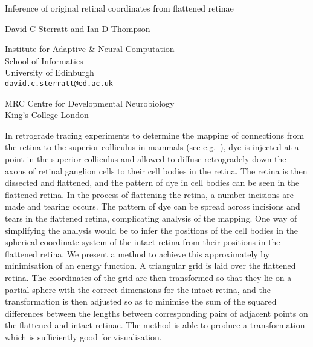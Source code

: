 \documentclass{article}
\title{}
\author{}
\date{}
\begin{document}
\setlength{\parindent}{0pt}

\Huge
\begin{center}
  \color{blue}Inference of original retinal coordinates from flattened retinae
\end{center}

\vspace{0.2\baselineskip}

\begin{center}
  David C Sterratt and Ian D Thompson
\end{center}

\vspace{0.2\baselineskip}

\raggedright
\Large

\begin{center}
  \begin{minipage}[t]{0.45\linewidth}\raggedright
    Institute for Adaptive \& Neural Computation\\
    School of Informatics\\
    University of Edinburgh \\
    \texttt{david.c.sterratt@ed.ac.uk}

  \end{minipage}
  \begin{minipage}[t]{0.45\linewidth}\raggedright
    MRC Centre for Developmental Neurobiology \\
    King's College London

  \end{minipage}
\end{center}

\vspace{\baselineskip}
\Large
In retrograde tracing experiments to determine the mapping of
connections from the retina to the superior colliculus in mammals (see
e.g.\ \citealp{RashEtal05oppo}), dye is injected at a point in the superior colliculus and allowed to diffuse retrogradely down the axons of retinal ganglion cells to their cell bodies in the retina. The retina is then dissected and flattened, and the pattern of dye in cell bodies can be seen in the flattened retina. In the process of flattening the retina, a number incisions are made and tearing occurs. The pattern of dye can be spread across incisions and tears in the flattened retina, complicating analysis of the mapping. One way of simplifying the analysis would be to infer the positions of the cell bodies in the spherical coordinate system of the intact retina from their positions in the flattened retina. We present a method to achieve this approximately by minimisation of an energy function. A triangular grid is laid over the flattened retina. The coordinates of the grid are then transformed so that they lie on a partial sphere with the correct dimensions for the intact retina, and the transformation is then adjusted so as to minimise the sum of the squared differences between the lengths between corresponding pairs of adjacent points on the flattened and intact retinae.  The method is able to produce a transformation which is sufficiently good for visualisation.
\end{document}
